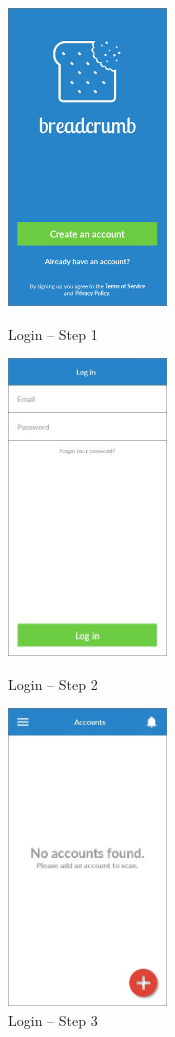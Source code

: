 \begin{figure}
  \subfigures
  \centering
  \begin{minipage}{4.6cm}
    \centering
    \includegraphics[width=4.2cm]{inc/ui_lg_step1.jpg}
    \caption{Login -- Step 1}
    \label{fig:ui_lg_step1}
  \end{minipage}
  \begin{minipage}{4.6cm}
    \centering
    \includegraphics[width=4.2cm]{inc/ui_lg_step2.jpg}
    \caption{Login -- Step 2}
    \label{fig:ui_lg_step2}
  \end{minipage}
  \begin{minipage}{4.6cm}
    \centering
    \includegraphics[width=4.2cm]{inc/ui_lg_step3.jpg}
    \caption{Login -- Step 3}
    \label{fig:ui_lg_step3}
  \end{minipage}
\end{figure}

